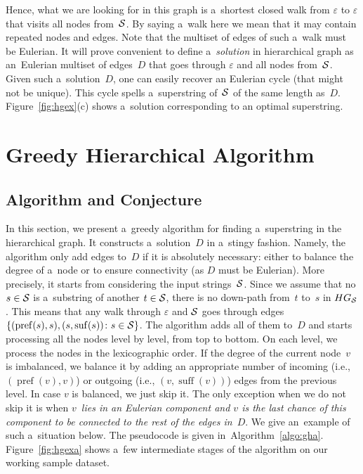 \documentclass[11pt,letterpaper]{article}
\DeclareMathOperator{\pref}{pref}
\DeclareMathOperator{\suff}{suff}
\begin{document}
Hence, what we are looking for in this graph is a~shortest closed walk from $\varepsilon$ to $\varepsilon$ that visits all nodes from~${\cal S}$. By saying a~walk here we mean that it may contain repeated nodes and edges. Note that the multiset of edges of such a~walk must be Eulerian. It will prove convenient to define a~{\em solution} in hierarchical graph as an~Eulerian multiset of edges~$D$ that goes through $\varepsilon$ and all nodes from~${\cal S}$. Given such a~solution~$D$, one can easily recover an Eulerian cycle (that might not be unique). This cycle spells a~superstring of~${\cal S}$ of the same length as~$D$. Figure~\ref{fig:hgex}(c) shows a~solution corresponding to an optimal superstring.

\section{Greedy Hierarchical Algorithm}
\subsection{Algorithm and Conjecture}
In this section, we present a~greedy algorithm for
finding a~superstring in the hierarchical graph. 
It constructs a~solution~$D$ in a~stingy fashion. 
Namely, the algorithm only add edges to~$D$ 
if it is absolutely necessary: either to balance the degree of a~node or to ensure connectivity 
(as $D$ must be Eulerian). 
More precisely, it starts from considering the input
strings~${\cal S}$. Since we assume that 
no $s \in {\cal S}$ is a~substring of another 
$t \in {\cal S}$, there is no down-path from~$t$ to~$s$ in $HG_{\cal S}$. 
This means that any walk through $\varepsilon$ and ${\cal S}$ goes through edges $\{(\operatorname{pref}(s), s), (s, \operatorname{suf}(s)) \colon s \in {\cal S}\}$. The algorithm adds all of them to~$D$ and starts processing all the nodes level by level, from top to bottom. On each level, we process the nodes in the lexicographic order. If the degree of the current node~$v$ is imbalanced, we balance it by adding an appropriate number of incoming (i.e., $(\pref(v),v)$) or outgoing (i.e., $(v, \suff(v))$) edges from the previous level. In case $v$ is balanced, we just skip it. The only exception when we do not skip it is when {\em $v$~lies in an Eulerian component and $v$ is the last chance of this component to be connected to the rest of the edges in~$D$}. We give an~example of such a~situation below. The pseudocode is given in~Algorithm~\ref{algo:gha}. Figure~\ref{fig:hgexa} shows a~few intermediate stages of the algorithm on our working sample dataset.
\end{document}
